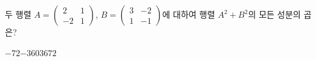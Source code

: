 두 행렬 $A=\begin{pmatrix} 2 & 1 \\ -2 & 1 \end{pmatrix}$, $B=\begin{pmatrix} 3 & -2 \\ 1 & -1 \end{pmatrix}$에 대하여 행렬 $A^2+B^2$의 모든 성분의 곱은?
\begin{choices32}{$-72$}{$-36$}{$0$}{$36$}{$72$}\end{choices32}
